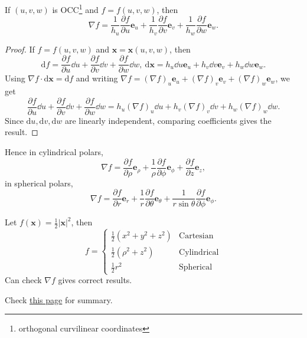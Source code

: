 \begin{proposition}\label{prop:2.1}
    If $ (u,v,w) $ is OCC\footnote{orthogonal curvilinear coordinates} and $f=f(u,v,w)$, then 
    \[
        \nabla f = \frac{1}{h_u}\frac{\partial f}{\partial u}\mathbf{e}_u + \frac{1}{h_v}\frac{\partial f}{\partial v}\mathbf{e}_v + \frac{1}{h_w}\frac{\partial f}{\partial w}\mathbf{e}_w.
    \] 
\end{proposition}
\begin{proof}
    If $ f=f(u,v,w) $ and $ \mathbf{x} = \mathbf{x}(u,v,w) $, then 
    \[
        \mathrm{d} f = \frac{\partial f}{\partial u}\dd u +\frac{\partial f}{\partial v}\dd v +\frac{\partial f}{\partial w}\dd w,\ \mathrm{d} \mathbf{x} = h_u\dd u\mathbf{e}_u+h_v\dd v\mathbf{e}_v+h_w\dd w\mathbf{e}_w.
    \]
    Using $\nabla f\cdot \mathrm{d} \mathbf{x} = \mathrm{d} f$ and writing $ \nabla f = (\nabla f)_u\mathbf{e}_u+(\nabla f)_v\mathbf{e}_v+(\nabla f)_w\mathbf{e}_w $, we get 
    \[
        \frac{\partial f}{\partial u}\dd u +\frac{\partial f}{\partial v}\dd v +\frac{\partial f}{\partial w}\dd w = h_u(\nabla f)_u \dd u+h_v(\nabla f)_v \dd v+h_w(\nabla f)_w \dd w.
    \]
    Since $ \mathrm{d} u, \mathrm{d} v,\mathrm{d} w $ are linearly independent, comparing coefficients gives the result.
\end{proof}

Hence in cylindrical polars,
\[
    \nabla f = \frac{\partial f}{\partial \rho}\mathbf{e}_\rho+\frac{1}{\rho} \frac{\partial f}{\partial \phi}\mathbf{e}_\phi+\frac{\partial f}{\partial z}\mathbf{e}_z,  
\]
in spherical polars,
\[
    \nabla f = \frac{\partial f}{\partial r}\mathbf{e}_r+\frac{1}{r}\frac{\partial f}{\partial \theta}\mathbf{e}_\theta+\frac{1}{r\sin\theta}\frac{\partial f}{\partial \phi}\mathbf{e}_\phi.   
\]
\begin{example}
    Let $ f(\mathbf{x})= \frac{1}{2}|\mathbf{x}|^2 $, then 
    \[
        f = \begin{cases}
        \frac{1}{2}(x^2+y^2+z^2) &\text{Cartesian}\\
        \frac{1}{2}(\rho^2+z^2) &\text{Cylindrical}\\
        \frac{1}{2}r^2 &\text{Spherical}
        \end{cases} 
    \]
    Can check $ \nabla f $ gives correct results.
\end{example}
Check \href{https://www.vle.cam.ac.uk/pluginfile.php/19798882/mod_resource/content/2/vc_notes1.pdf#page=17}{this page} for summary.